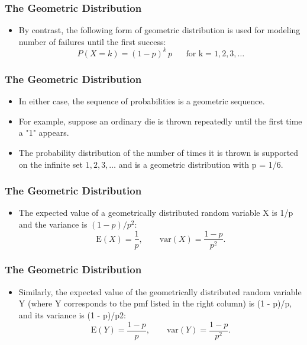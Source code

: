 \begin{frame}
\frametitle{The Geometric Distribution}
\Large
\begin{itemize}
\item

By contrast, the following form of geometric distribution is used for modeling number of failures until the first success:
\[ P(X=k) = (1 - p)^k\,p\, \phantom{spa} \mbox{for k} = 1, 2, 3, \ldots \]

\end{itemize}
\end{frame}
\begin{frame}
\frametitle{The Geometric Distribution}
\Large
\vspace{-1cm}
\begin{itemize}
\item
In either case, the sequence of probabilities is a geometric sequence.

\item For example, suppose an ordinary die is thrown repeatedly until the first time a "1" appears. 
\item The probability distribution of the number of times it is thrown is supported on the infinite set ${ 1, 2, 3, \ldots }$ and is a geometric distribution with p = 1/6.
\end{itemize}
\end{frame}
\begin{frame}
\frametitle{The Geometric Distribution}
\Large
\begin{itemize}
\item

The expected value of a geometrically distributed random variable X is 1/p and the variance is $(1 - p)/p^2$:
\[ \mathrm{E}(X) = \frac{1}{p}, \qquad\mathrm{var}(X) = \frac{1-p}{p^2}. \]
\end{itemize}
\end{frame}
\begin{frame}
\frametitle{The Geometric Distribution}
\Large
\vspace{-1cm}
\begin{itemize}
\item Similarly, the expected value of the geometrically distributed random variable Y (where Y corresponds to the pmf listed in the right column) is (1 - p)/p, 
and its variance is (1 - p)/p2:
\[ \mathrm{E}(Y) = \frac{1-p}{p}, \qquad\mathrm{var}(Y) = \frac{1-p}{p^2}.\]

\end{itemize}
\end{frame}



